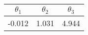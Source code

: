 \begin{tabular}{ccc}
$\theta_1$ & $\theta_2$ & $\theta_3$ \\
\midrule 
-0.012 & 1.031 & 4.944 \\
\bottomrule 
\end{tabular}
